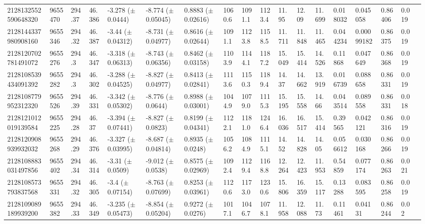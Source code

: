 \begin{sidewaystable}[htbp]
{\begin{tabular}{llllllllllllllllll}
        2128132552590648320 & 9655470 & 294.37 & 46.386 & -3.278 ($\pm$ 0.0444) & -8.774 ($\pm$ 0.05045) & 0.8883 ($\pm$ 0.02616) & 1060.6 & 1091.1 & 1123.4 & 11.95 & 12.09 & 11.699 & 0.018032 & 0.045058 & 0.86406 & 0.019 & \\
        2128144337980908160 & 9655346 & 294.32 & 46.387 & -3.44 ($\pm$ 0.04312) & -8.731 ($\pm$ 0.04977) & 0.8616 ($\pm$ 0.02644) & 1091.1 & 1123.8 & 1158.5 & 11.711 & 11.848 & 11.465 & 0.044234 & 0.00099182 & 0.86375 & 0.019 & \\
        2128120702781491072 & 9655276 & 294.3 & 46.347 & -3.318 ($\pm$ 0.06313) & -8.743 ($\pm$ 0.06356) & 0.8462 ($\pm$ 0.03158) & 1103.9 & 1144.1 & 1187.2 & 15.049 & 15.414 & 14.526 & 0.11868 & 0.047649 & 0.86368 & 0.019 & \\
        2128108539434091392 & 9655282 & 294.3 & 46.302 & -3.288 ($\pm$ 0.04525) & -8.827 ($\pm$ 0.04977) & 0.8413 ($\pm$ 0.02841) & 1113.6 & 1150.3 & 1189.4 & 14.37 & 14.662 & 13.919 & 0.016739 & 0.088658 & 0.86331 & 0.019 & \\
        2128108779952312320 & 9655526 & 294.39 & 46.331 & -3.342 ($\pm$ 0.05302) & -8.776 ($\pm$ 0.0644) & 0.8988 ($\pm$ 0.03001) & 1044.9 & 1079.0 & 1115.3 & 15.195 & 15.558 & 14.66 & 0.043514 & 0.089558 & 0.86331 & 0.018 & \\
        2128121012019139584 & 9655225 & 294.28 & 46.37 & -3.394 ($\pm$ 0.07441) & -8.827 ($\pm$ 0.0823) & 0.8199 ($\pm$ 0.04341) & 1122.1 & 1181.0 & 1246.4 & 16.036 & 16.517 & 15.414 & 0.39565 & 0.042121 & 0.86316 & 0.019 & \\
        2128120908939932032 & 9655268 & 294.29 & 46.376 & -3.327 ($\pm$ 0.03995) & -8.687 ($\pm$ 0.04814) & 0.8935 ($\pm$ 0.0248) & 1056.2 & 1084.9 & 1115.1 & 14.52 & 14.828 & 14.05 & 0.056612 & 0.030168 & 0.86266 & 0.019 & \\
        2128108883031497856 & 9655402 & 294.34 & 46.314 & -3.31 ($\pm$ 0.0509) & -9.012 ($\pm$ 0.0538) & 0.8575 ($\pm$ 0.02969) & 1092.4 & 1129.4 & 1168.8 & 12.264 & 12.423 & 11.953 & 0.54859 & 0.077174 & 0.86263 & 0.021 & \\
        2128108573793837568 & 9655331 & 294.32 & 46.305 & -3.4 ($\pm$ 0.07154) & -8.763 ($\pm$ 0.07699) & 0.8253 ($\pm$ 0.03961) & 1120.6 & 1173.0 & 1230.6 & 15.806 & 16.359 & 15.117 & 0.13288 & 0.083595 & 0.86258 & 0.019 & \\
        2128109089189939200 & 9655382 & 294.33 & 46.349 & -3.235 ($\pm$ 0.05473) & -8.854 ($\pm$ 0.05204) & 0.9272 ($\pm$ 0.0276) & 1017.1 & 1046.7 & 1078.1 & 11.958 & 12.088 & 11.73 & 0.11461 & 0.04131 & 0.86244 & 0.02 & \\

\end{tabular}}
\end{sidewaystable}
